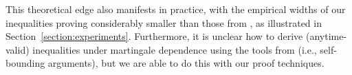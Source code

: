 This theoretical edge also manifests in practice, with the empirical widths of our inequalities proving considerably smaller than those from \citet{maurer2009empirical}, as illustrated in Section~\ref{section:experiments}. Furthermore, it is unclear how to derive (anytime-valid) inequalities under martingale dependence using the tools from \citet[Theorem 10]{maurer2009empirical} (i.e., self-bounding  arguments), but we are able to do this with our proof techniques.








